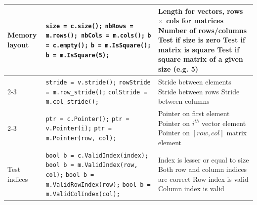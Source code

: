 \documentclass[letterpaper,10pt]{article}
\begin{document}
\begin{center}
\begin{tabular}{|p{1.1in}|p{3.1in}|p{2.6in}|}
          Memory layout
          &
          \texttt{size = c.size();} \newline
          \texttt{nbRows = m.rows(); nbCols = m.cols();} \newline
          \texttt{b = c.empty();} \newline
          \texttt{b = m.IsSquare();} \newline
          \texttt{b = m.IsSquare(5);} 
          &
          Length for vectors, rows $\times$ cols for matrices\newline
          Number of rows/columns \newline
          Test if size is zero \newline
          Test if matrix is square \newline
          Test if square matrix of a given size (e.g. 5)
          \\
          \cline{2-3}
          &
          \texttt{stride = v.stride();} \newline
          \texttt{rowStride = m.row\_stride();} \newline
          \texttt{colStride = m.col\_stride();}
          &
          Stride between elements \newline
          Stride between rows \newline
          Stride between columns
          \\
          \cline{2-3}
          &
          \texttt{ptr = c.Pointer();} \newline
          \texttt{ptr = v.Pointer(i);} \newline
          \texttt{ptr = m.Pointer(row, col);}
          &
          Pointer on first element \newline
          Pointer on $i^{th}$ vector element \newline
          Pointer on $[row,col]$ matrix element
          \\
          \hline

          Test indices
          &
          \texttt{bool b = c.ValidIndex(index);} \newline
          \texttt{bool b = m.ValidIndex(row, col);} \newline
          \texttt{bool b = m.ValidRowIndex(row);} \newline
          \texttt{bool b = m.ValidColIndex(col);}
          &
          Index is lesser or equal to size \newline
          Both row and column indices are correct \newline
          Row index is valid \newline
          Column index is valid
          \\
          \hline


\end{tabular}
\end{center}
\end{document}
